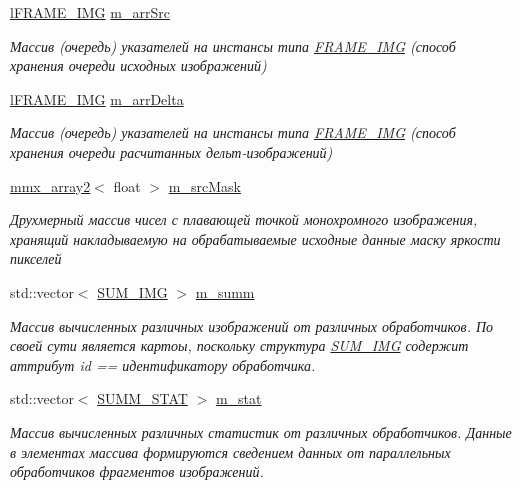 \begin{DoxyCompactItemize}
\hyperlink{classl_f_r_a_m_e___i_m_g}{l\+F\+R\+A\+M\+E\+\_\+\+I\+M\+G} \hyperlink{class_c_v_i_engine_base_a9b14da4c2f0ccba53a81ab89b89b2a03}{m\+\_\+arr\+Src}
\begin{DoxyCompactList}\small\item\em Массив (очередь) указателей на инстансы типа \hyperlink{class_f_r_a_m_e___i_m_g}{F\+R\+A\+M\+E\+\_\+\+I\+M\+G} (способ хранения очереди исходных изображений) \end{DoxyCompactList}\item 
\hyperlink{classl_f_r_a_m_e___i_m_g}{l\+F\+R\+A\+M\+E\+\_\+\+I\+M\+G} \hyperlink{class_c_v_i_engine_base_abd1077e6704b0f6bbc788c4d3e7f150e}{m\+\_\+arr\+Delta}
\begin{DoxyCompactList}\small\item\em Массив (очередь) указателей на инстансы типа \hyperlink{class_f_r_a_m_e___i_m_g}{F\+R\+A\+M\+E\+\_\+\+I\+M\+G} (способ хранения очереди расчитанных дельт-\/изображений) \end{DoxyCompactList}\item 
\hyperlink{classmmx__array2}{mmx\+\_\+array2}$<$ float $>$ \hyperlink{class_c_v_i_engine_base_a0b3b91816e3f19ec5e531c5ad903be98}{m\+\_\+src\+Mask}
\begin{DoxyCompactList}\small\item\em Друхмерный массив чисел с плавающей точкой монохромного изображения, хранящий накладываемую на обрабатываемые исходные данные маску яркости пикселей \end{DoxyCompactList}\item 
std\+::vector$<$ \hyperlink{class_s_u_m___i_m_g}{S\+U\+M\+\_\+\+I\+M\+G} $>$ \hyperlink{class_c_v_i_engine_base_a29b792994f8c587ebdd4296031032f68}{m\+\_\+summ}
\begin{DoxyCompactList}\small\item\em Массив вычисленных различных изображений от различных обработчиков. По своей сути является картоы, поскольку структура \hyperlink{class_s_u_m___i_m_g}{S\+U\+M\+\_\+\+I\+M\+G} содержит аттрибут id == идентификатору обработчика. \end{DoxyCompactList}\item 
std\+::vector$<$ \hyperlink{class_s_u_m_m___s_t_a_t}{S\+U\+M\+M\+\_\+\+S\+T\+A\+T} $>$ \hyperlink{class_c_v_i_engine_base_a73ff2aaa9eeb589ce6ea73ef5dd62fda}{m\+\_\+stat}
\begin{DoxyCompactList}\small\item\em Массив вычисленных различных статистик от различных обработчиков. Данные в элементах массива формируются сведением данных от параллельных обработчиков фрагментов изображений. \end{DoxyCompactList}\item 

\end{DoxyCompactItemize}

